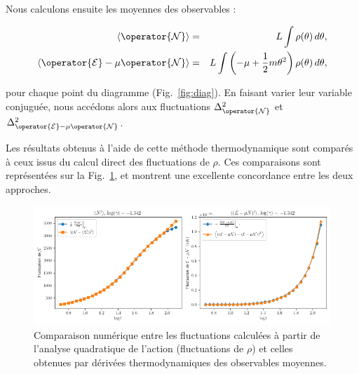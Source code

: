 Nous calculons ensuite les moyennes des observables :

\begin{eqnarray*}
    \langle \operator{\mathcal{N}} \rangle &=& L \int \rho(\theta) \, d\theta, \\
    \langle \operator{\mathcal{E}} - \mu \operator{\mathcal{N}} \rangle &=& L \int \left( - \mu + \frac{1}{2} m \theta^2 \right) \rho(\theta) \, d\theta,
\end{eqnarray*}

pour chaque point du diagramme (Fig.~\ref{fig:diag}). En faisant varier leur variable conjuguée, nous accédons alors aux fluctuations $\Delta_{\operator{\mathcal{N}}}^2 $ et $\Delta_{\operator{\mathcal{E}} - \mu \operator{\mathcal{N}}}^2$.


Les résultats obtenus à l’aide de cette méthode thermodynamique sont comparés à ceux issus du calcul direct des fluctuations de \( \rho \). Ces comparaisons sont représentées sur la Fig.~\ref{fig.fluctu.A_com}, et montrent une excellente concordance entre les deux approches.

\begin{figure}[H]
	\centering 
	\includegraphics[width=1\textwidth]{Figures/fluctuations_plot_log_gamma=-1.342.png}	
	\caption{Comparaison numérique entre les fluctuations calculées à partir de l’analyse quadratique de l’action (fluctuations de \( \rho \)) et celles obtenues par dérivées thermodynamiques des observables moyennes.}
	\label{fig.fluctu.A_com}
\end{figure}

